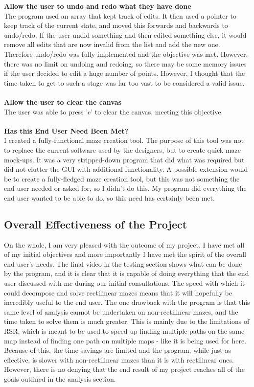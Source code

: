 \documentclass[titlepage]{article}
\begin{document}
\textbf{Allow the user to undo and redo what they have done}\\
The program used an array that kept track of edits. It then used a pointer to keep track of the current state, and moved this forwards and backwards to undo/redo. If the user undid something and then edited something else, it would remove all edits that are now invalid from the list and add the new one. Therefore undo/redo was fully implemented and the objective was met. However, there was no limit on undoing and redoing, so there may be some memory issues if the user decided to edit a huge number of points. However, I thought that the time taken to get to such a stage was far too vast to be considered a valid issue.\\\\
\textbf{Allow the user to clear the canvas}\\
The user was able to press 'c' to clear the canvas, meeting this objective. \\\\
\textbf{Has this End User Need Been Met?}\\
I created a fully-functional maze creation tool. The purpose of this tool was not to replace the current software used by the designers, but to create quick maze mock-ups. It was a very stripped-down program that did what was required but did not clutter the GUI with additional functionality. A possible extension would be to create a fully-fledged maze creation tool, but this was not something the end user needed or asked for, so I didn't do this. My program did everything the end user wanted to be able to do, so this need has certainly been met.

\subsection{Overall Effectiveness of the Project}
On the whole, I am very pleased with the outcome of my project. I have met all of my initial objectives and more importantly I have met the spirit of the overall end user's needs. The final video in the testing section shows what can be done by the program, and it is clear that it is capable of doing everything that the end user discussed with me during our initial consultations. The speed with which it could decompose and solve rectilinear mazes means that it will hopefully be incredibly useful to the end user. The one drawback with the program is that this same level of analysis cannot be undertaken on non-rectilinear mazes, and the time taken to solve them is much greater. This is mainly due to the limitations of RSR, which is meant to be used to speed up finding multiple paths on the same map instead of finding one path on multiple maps - like it is being used for here. Because of this, the time savings are limited and the program, while just as effective, is slower with non-rectilinear mazes than it is with rectilinear ones. However, there is no denying that the end result of my project reaches all of the goals outlined in the analysis section. 
\end{document}
